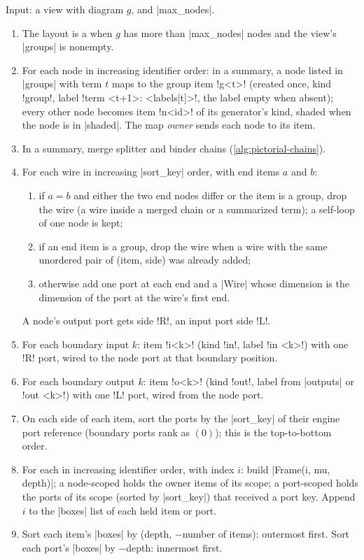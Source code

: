 \begin{algorithm}[Extraction]\label{alg:pictorial-extract}
Input: a view with diagram $g$, and \py|max_nodes|.
\begin{enumerate}
  \item The layout is a  when $g$ has more than \py|max_nodes| nodes and the view's
    \py|groups| is nonempty.
  \item For each node in increasing identifier order: in a summary, a node listed in
    \py|groups| with term $t$ maps to the group item \code!g<t>! (created once, kind
    \code!group!, label \code!term <t+1>: <labels[t]>!, the label empty when absent); every other
    node becomes item \code!n<id>! of its generator's kind, shaded when the node is in
    \py|shaded|. The map \emph{owner} sends each node to its item.
  \item In a summary, merge splitter and binder chains (\cref{alg:pictorial-chains}).
  \item For each wire in increasing \py|sort_key| order, with end items $a$ and $b$:
    \begin{enumerate}
      \item if $a=b$ and either the two end nodes differ or the item is a group, drop the wire
        (a wire inside a merged chain or a summarized term); a self-loop of one node is kept;
      \item if an end item is a group, drop the wire when a wire with the same unordered pair of
        (item, side) was already added;
      \item otherwise add one port at each end and a \py|Wire| whose dimension is the dimension
        of the port at the wire's first end.
    \end{enumerate}
    A node's output port gets side \code!R!, an input port side \code!L!.
  \item For each boundary input $k$: item \code!i<k>! (kind \code!in!, label \code!in <k>!) with
    one \code!R! port, wired to the node port at that boundary position.
  \item For each boundary output $k$: item \code!o<k>! (kind \code!out!, label from
    \py|outputs| or \code!out <k>!) with one \code!L! port, wired from the node port.
  \item On each side of each item, sort the ports by the \py|sort_key| of their engine port
    reference (boundary ports rank as $(0)$); this is the top-to-bottom order.
  \item For each \bbox{} in increasing identifier order, with index $i$: build
    \py|Frame(i, mu, depth)|; a node-scoped \bbox{} holds the owner items of its scope; a
    port-scoped \bbox{} holds the ports of its scope (sorted by \py|sort_key|) that received a
    port key. Append $i$ to the \py|boxes| list of each held item or port.
  \item Sort each item's \py|boxes| by (depth, $-$number of items): outermost first. Sort each
    port's \py|boxes| by $-$depth: innermost first.
\end{enumerate}
\end{algorithm}

